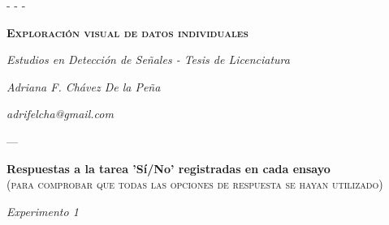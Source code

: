 \documentclass[a4paper ]{article}
\begin{document}
- - -

\vspace{50mm}
\begin{center}
{\Huge \textsc{\textbf{Exploración visual de datos individuales}}}\\
\vspace{20mm}
\end{center}

\begin{center}
\textit{\huge Estudios en Detección de Señales - Tesis de Licenciatura}\\
\bigskip
\end{center}

\begin{center}
\textit{\huge Adriana F. Chávez De la Peña}\\
\end{center}

\begin{center}
\vfill
\textit{\huge adrifelcha@gmail.com}\\
\end{center}

\newpage




---
\vspace{3mm}
\begin{center}
{\LARGE \textbf{Respuestas a la tarea 'Sí/No' registradas en cada ensayo}}\\
{\small \textsc{(para comprobar que todas las opciones de respuesta se hayan utilizado)}}\\
\smallskip
\end{center}
\begin{center}
{\LARGE \textit{Experimento 1}}\\
\end{center}
\end{document}
